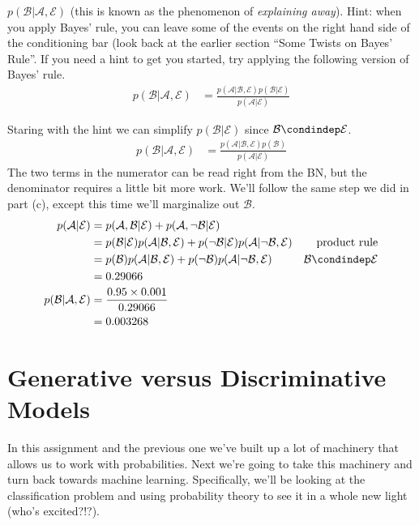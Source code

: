 \documentclass[assignment02_Solutions]{subfiles}
\begin{document}
\begin{exercise}[(60 minutes)]
\item $p(\mathcal{B} | \mathcal{A}, \mathcal{E})$ (this is known as the phenomenon of \emph{explaining away}).  Hint: when you apply Bayes' rule, you can leave some of the events on the right hand side of the conditioning bar (look back at the earlier section ``Some Twists on Bayes' Rule''.  If you need a hint to get you started, try applying the following version of Bayes' rule.
\begin{align}
p(\mathcal{B} | \mathcal{A}, \mathcal{E}) &= \frac{p(\mathcal{A} | \mathcal{B}, \mathcal{E}) p(\mathcal{B} | \mathcal{E})}{p(\mathcal{A} | \mathcal{E})} \nonumber
\end{align}


\begin{boxedsolution}
Staring with the hint we can simplify $p(\mathcal{B} | \mathcal{E})$ since $\mathcal{B} \condindep \mathcal{E}$.
\begin{align}
p(\mathcal{B} | \mathcal{A}, \mathcal{E}) &= \frac{p(\mathcal{A} | \mathcal{B}, \mathcal{E}) p(\mathcal{B})}{p(\mathcal{A} | \mathcal{E})} \nonumber
\end{align}
The two terms in the numerator can be read right from the BN, but the denominator requires a little bit more work.  We'll follow the same step we did in part (c), except this time we'll marginalize out $\mathcal{B}$.
\begin{align}
p(\mathcal{A} | \mathcal{E}) &= p(\mathcal{A}, \mathcal{B} | \mathcal{E}) + p(\mathcal{A}, \neg \mathcal{B} | \mathcal{E}) \nonumber \\
&= p(\mathcal{B} | \mathcal{E}) p(\mathcal{A} | \mathcal{B}, \mathcal{E}) + p(\neg \mathcal{B} | \mathcal{E}) p(\mathcal{A} | \neg \mathcal{B}, \mathcal{E}) & \mbox{product rule}\nonumber \\
&=  p(\mathcal{B}) p(\mathcal{A} | \mathcal{B}, \mathcal{E}) + p(\neg \mathcal{B}) p(\mathcal{A} | \neg \mathcal{B}, \mathcal{E})  & \mathcal{B} \condindep \mathcal{E} \nonumber \\
&= 0.29066 \nonumber \\
p(\mathcal{B} | \mathcal{A}, \mathcal{E}) &= \frac{0.95 \times 0.001}{0.29066} \nonumber \\
&= 0.003268 \nonumber
\end{align}

\end{boxedsolution}

\ees
\end{exercise}

\section{Generative versus Discriminative Models}
In this assignment and the previous one we've built up a lot of machinery that allows us to work with probabilities.  Next we're going to take this machinery and turn back towards machine learning.  Specifically, we'll be looking at the classification problem and using probability theory to see it in a whole new light (who's excited?!?).
\end{document}
